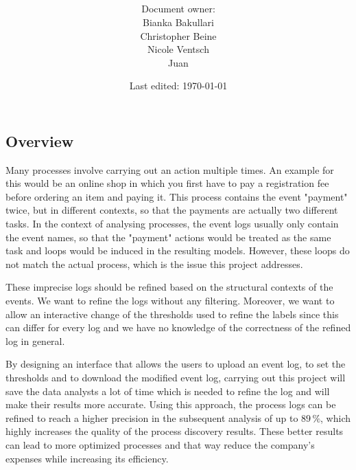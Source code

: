 \documentclass[notitlepage]{article}
\title{%
	\documentName\text{ } \\
  \large \projectName\text{ } \\
  }
\author{
	\large Document owner:\\
	Bianka Bakullari\\
	\texttt{}
	Christopher Beine\\
	\texttt{}
	Nicole Ventsch\\
	\texttt{}
	Juan\\
	\texttt{}
}
\date{\small{Last edited: \today}}
\begin{document}
\begin{titlepage}
\clearpage\maketitle			%
\thispagestyle{fancy}
\tableofcontents
\end{titlepage}

\rfoot{\thepage}				%


\begin{flushleft}				%

\section{Overview}
Many processes involve carrying out an action multiple times. An example for this would be an online shop in which you first have to pay a registration fee before ordering an item and paying it. This process contains the event "payment" twice, but in different contexts, so that the payments are actually two different tasks. In the context of analysing processes, the event logs usually only contain the event names, so that the "payment" actions would be treated as the same task and loops would be induced in the resulting models. However, these loops do not match the actual process, which is the issue this project addresses. 

These imprecise logs should be refined based on the structural contexts of the events. We want to refine the logs without any filtering. Moreover, we want to allow an interactive change of the thresholds used to refine the labels since this can differ for every log and we have no knowledge of the correctness of the refined log in general.

By designing an interface that allows the users to upload an event log, to set the thresholds and to download the modified event log, carrying out this project will save the data analysts a lot of time which is needed to refine the log and will make their results more accurate.  Using this approach, the process logs can be refined to reach a higher precision in the subsequent analysis of up to $89 \, \% $, which highly increases the quality of the process discovery results. These better results can lead to more optimized processes and that way reduce the company's expenses while increasing its efficiency. 



\end{flushleft}
\end{document}
